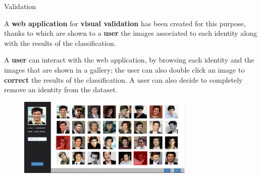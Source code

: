 \begin{tframe}{Validation}

A \textbf{web application} for \textbf{visual validation} has been created for this purpose, thanks to which are shown to a \textbf{user} the images associated to each identity along with the results of the classification.

\vspace{0.1in}

A \textbf{user} can interact with the web application, by browsing each identity and the images that are shown in a gallery; the user can also double click an image to \textbf{correct} the results of the classification. A user can also decide to completely remove an identity from the dataset.

\begin{figure}[h]
\begin{center}
\includegraphics[width=0.75\textwidth]{images/image5.png}
\end{center}
\end{figure}

\end{tframe}